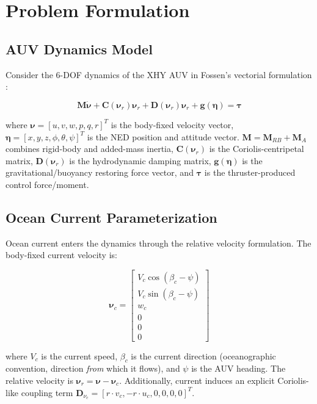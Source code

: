 \section{Problem Formulation}

\subsection{AUV Dynamics Model}

Consider the 6-DOF dynamics of the XHY AUV in Fossen's vectorial formulation \cite{fossen2011handbook}:

\begin{equation}
    \bm{M}\dot{\bm{\nu}} + \bm{C}(\bm{\nu}_r)\bm{\nu}_r + \bm{D}(\bm{\nu}_r)\bm{\nu}_r + \bm{g}(\bm{\eta}) = \bm{\tau}
    \label{eq:dynamics}
\end{equation}

where $\bm{\nu}=[u,v,w,p,q,r]^T$ is the body-fixed velocity vector, $\bm{\eta}=[x,y,z,\phi,\theta,\psi]^T$ is the NED position and attitude vector. $\bm{M}=\bm{M}_{RB}+\bm{M}_A$ combines rigid-body and added-mass inertia, $\bm{C}(\bm{\nu}_r)$ is the Coriolis-centripetal matrix, $\bm{D}(\bm{\nu}_r)$ is the hydrodynamic damping matrix, $\bm{g}(\bm{\eta})$ is the gravitational/buoyancy restoring force vector, and $\bm{\tau}$ is the thruster-produced control force/moment.

\subsection{Ocean Current Parameterization}

Ocean current enters the dynamics through the relative velocity formulation. The body-fixed current velocity is:

\begin{equation}
    \bm{\nu}_c = \begin{bmatrix}
        V_c\cos(\beta_c-\psi) \\ V_c\sin(\beta_c-\psi) \\ w_c \\ 0 \\ 0 \\ 0
    \end{bmatrix}
    \label{eq:nuc}
\end{equation}

where $V_c$ is the current speed, $\beta_c$ is the current direction (oceanographic convention, direction \emph{from} which it flows), and $\psi$ is the AUV heading. The relative velocity is $\bm{\nu}_r = \bm{\nu} - \bm{\nu}_c$. Additionally, current induces an explicit Coriolis-like coupling term $\bm{D}_{\nu_c} = [r\cdot v_c, -r\cdot u_c, 0, 0, 0, 0]^T$.

